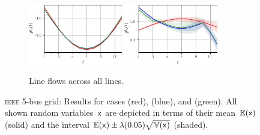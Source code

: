 \documentclass[final,3p,times,twocolumn]{elsarticle}  %
\begin{document}
\begin{figure}
\begin{subfigure}[c]{\figwidth}
        \includegraphics[width=0.45\textwidth]{figures/time series/case5_artificial/line_905.jpg}
        \includegraphics[width=0.45\textwidth]{figures/time series/case5_artificial/line_906.jpg}
		\vspace{-2mm}		
		\caption{Line flows across all lines.}
		\label{fig:case5:LineFlows}
	\end{subfigure}
	\vspace{\adjustlength}
	\caption{\textsc{ieee} 5-bus grid: Results for cases \caseNoStorage (red), \caseStorage (blue), and \caseStorageWithVariance (green). All shown random variables~$\mathsf{x}$ are depicted in terms of their mean~$\mathbb{E}(\mathsf{x})$ (solid) and the interval $\mathbb{E}(\mathsf{x}) \pm \lambda (0.05) \sqrt{\mathbb{V}(\mathsf{x})}$ (shaded).}
	\label{fig:case5:results_artificial_newLoads}
\end{figure}
\end{document}
